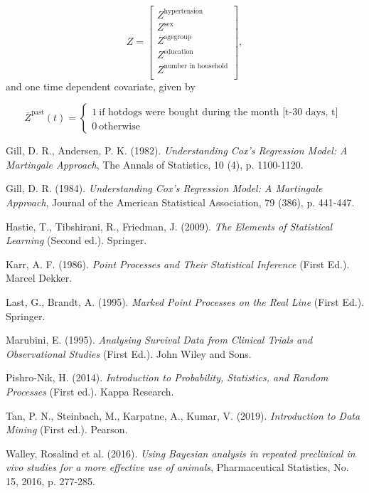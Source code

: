 \documentclass[
  11pt,
]{article}
\begin{document}
\[
Z =\begin{bmatrix}
    Z^{\text{hypertension}}\\
    Z^{\text{sex}} \\
    Z^{\text{agegroup}} \\
    Z^{\text{education}} \\
    Z^{\text{number in household}}\\
\end{bmatrix},
\] and one time dependent covariate, given by

\[
\bar{Z}^{\text{past}}(t) = 
\begin{cases}
 1 \ \text{if hotdogs were bought during the month [t-30 days, t] } \\ 
0 \ \text{otherwise}
\end{cases}
\]

\newpage 
\begin{thebibliography}{1}

 Gill, D. R., Andersen, P. K. (1982). \textit{Understanding Cox's Regression Model: A Martingale Approach}, The Annals of Statistics, 10 (4), p. 1100-1120.

 Gill, D. R. (1984). \textit{Understanding Cox's Regression Model: A Martingale Approach}, Journal of the American Statistical Association, 79 (386), p. 441-447.

 Hastie, T., Tibshirani, R., Friedman, J. (2009). \textit{The Elements of Statistical Learning} (Second ed.). Springer. 

 Karr, A. F. (1986). \textit{Point Processes and Their Statistical Inference} (First Ed.). Marcel Dekker.

 Last, G., Brandt, A. (1995). \textit{Marked Point Processes on the Real Line} (First Ed.). Springer.

 Marubini, E. (1995). \textit{Analysing Survival Data from Clinical Trials and Observational Studies} (First Ed.). John Wiley and Sons.

 Pishro-Nik, H. (2014). \textit{Introduction to Probability, Statistics, and Random Processes} (First ed.). Kappa Research. 

 Tan, P. N., Steinbach, M., Karpatne, A., Kumar, V. (2019). \textit{Introduction to Data Mining} (First ed.). Pearson.

 Walley, Rosalind et al. (2016). \textit{Using Bayesian analysis in repeated preclinical in vivo studies for a more effective use of animals}, Pharmaceutical Statistics, No. 15, 2016, p. 277-285.

\end{thebibliography}
\end{document}
